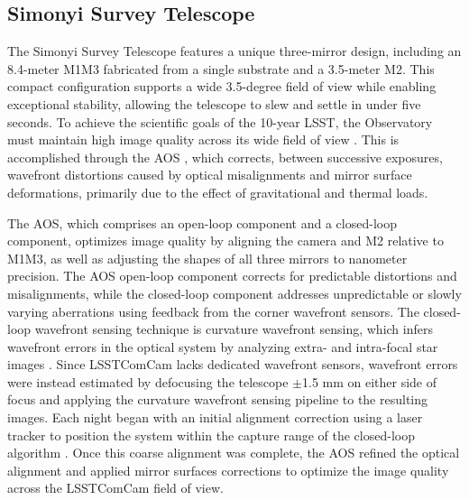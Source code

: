 
\subsection{Simonyi Survey Telescope
\label{ssec:simonyi}}

The Simonyi Survey Telescope \citep{2024SPIE13094E..09S} features a unique three-mirror design, including an 8.4-meter \gls{M1M3} fabricated from a single substrate and a 3.5-meter \gls{M2}.
This compact \gls{configuration} supports a wide 3.5-degree field of view while enabling exceptional stability, allowing the telescope to slew and settle in under five seconds.
To achieve the scientific goals of the 10-year \gls{LSST}, the Observatory must maintain high image quality across its wide field of view \citep{2008arXiv0805.2366I}.
This is accomplished through the \gls{AOS} \citep{2015ApOpt..54.9045X,MegiasHomar_2024}, which corrects, between successive exposures, wavefront distortions caused by optical misalignments and mirror surface deformations, primarily due to the effect of gravitational and thermal loads.

The \gls{AOS}, which comprises an open-loop component and a closed-loop component, optimizes image quality by aligning the camera and \gls{M2} relative to \gls{M1M3}, as well as adjusting the shapes of all three mirrors to nanometer precision.
The \gls{AOS} open-loop component corrects for predictable distortions and misalignments, while the closed-loop component addresses unpredictable or slowly varying aberrations using feedback from the corner wavefront sensors.
The closed-loop wavefront sensing technique is curvature wavefront sensing, which infers wavefront errors in the optical system by analyzing extra- and intra-focal star images \citep{2023aoel.confE..67T}.
Since \gls{LSSTComCam} lacks dedicated wavefront sensors, wavefront errors were instead estimated by defocusing the telescope $\pm$1.5 mm on either side of focus and applying the curvature wavefront sensing pipeline to the resulting images.
Each night began with an initial alignment correction using a laser tracker to position the system within the capture range of the closed-loop \gls{algorithm} \citep{10.1117/12.3019031}.
Once this coarse alignment was complete, the \gls{AOS} refined the optical alignment and applied mirror surfaces corrections to optimize the image quality across the \gls{LSSTComCam} field of view.

